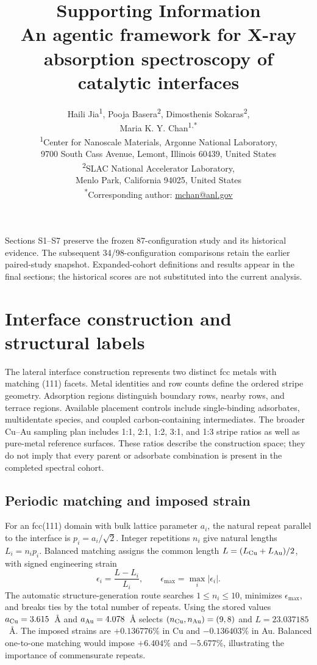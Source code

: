 \documentclass[11pt,a4paper]{article}
\title{Supporting Information\\[0.5em]\large An agentic framework for X-ray absorption spectroscopy of catalytic interfaces}
\author{\small Haili Jia\textsuperscript{1}, Pooja Basera\textsuperscript{2}, Dimosthenis Sokaras\textsuperscript{2},\\
\small Maria K. Y. Chan\textsuperscript{1,*}\\[0.6em]
\small \textsuperscript{1}Center for Nanoscale Materials, Argonne National Laboratory,\\
\small 9700 South Cass Avenue, Lemont, Illinois 60439, United States\\
\small \textsuperscript{2}SLAC National Accelerator Laboratory,\\
\small Menlo Park, California 94025, United States\\
\small \textsuperscript{*}Corresponding author: \href{mailto:mchan@anl.gov}{mchan@anl.gov}}
\date{}
\begin{document}
\maketitle
\noindent Sections S1--S7 preserve the frozen 87-configuration study and its historical evidence. The subsequent 34/98-configuration comparisons retain the earlier paired-study snapshot. Expanded-cohort definitions and results appear in the final sections; the historical scores are not substituted into the current analysis.
\section{Interface construction and structural labels}
The lateral interface construction represents two distinct fcc metals with matching (111) facets. Metal identities and row counts define the ordered stripe geometry. Adsorption regions distinguish boundary rows, nearby rows, and terrace regions. Available placement controls include single-binding adsorbates, multidentate species, and coupled carbon-containing intermediates. The broader Cu--Au sampling plan includes 1:1, 2:1, 1:2, 3:1, and 1:3 stripe ratios as well as pure-metal reference surfaces. These ratios describe the construction space; they do not imply that every parent or adsorbate combination is present in the completed spectral cohort.

\subsection{Periodic matching and imposed strain}
For an fcc(111) domain with bulk lattice parameter $a_i$, the natural repeat parallel to the interface is $p_i=a_i/\sqrt{2}$. Integer repetitions $n_i$ give natural lengths $L_i=n_i p_i$. Balanced matching assigns the common length $L=(L_{\rm Cu}+L_{\rm Au})/2$, with signed engineering strain
\begin{equation}
\epsilon_i=\frac{L-L_i}{L_i},\qquad
\epsilon_{\max}=\max_i|\epsilon_i|.
\end{equation}
The automatic structure-generation route searches $1\le n_i\le10$, minimizes $\epsilon_{\max}$, and breaks ties by the total number of repeats. Using the stored values $a_{\rm Cu}=3.615$~\AA{} and $a_{\rm Au}=4.078$~\AA{} selects $(n_{\rm Cu},n_{\rm Au})=(9,8)$ and $L=23.037185$~\AA{}. The imposed strains are $+0.136776\%$ in Cu and $-0.136403\%$ in Au. Balanced one-to-one matching would impose $+6.404\%$ and $-5.677\%$, illustrating the importance of commensurate repeats.
\end{document}
